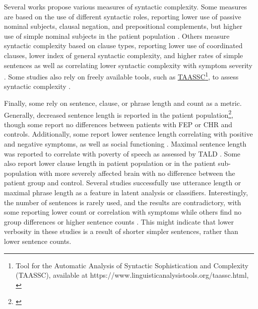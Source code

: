 Several works propose various measures of syntactic complexity. Some measures are based on the use of different syntactic roles, reporting lower use of passive nominal subjects, clausal negation, and prepositional complements, but higher use of simple nominal subjects in the patient population \citep{silva2022syntactic}. Others measure syntactic complexity based on clause types, reporting lower use of coordinated clauses, lower index of general syntactic complexity, and higher rates of simple sentences \citep{schneider2023syntactic} as well as correlating lower syntactic complexity %
with symptom severity \citep{jeong2023exploring}. Some studies also rely on freely available tools, such as \href{https://www.linguisticanalysistools.org/taassc.html}{TAASSC}\footnote{ Tool for the Automatic Analysis of Syntactic Sophistication and Complexity (TAASSC), available at https://www.linguisticanalysistools.org/taassc.html, \citep{kyle2016measuring}}, to assess syntactic complexity \citep{liang2022widespread, silva2022syntactic}.

Finally, some rely on sentence, clause, or phrase length and count as a metric. Generally, decreased sentence length is reported in the patient population\footnote{\cite{iter2018automatic, morgan2021natural, spencer2021lower, tang2021natural, bilgrami2022construct, silva2022syntactic, nettekoven2023semantic, schneider2023syntactic}}, though some report no differences between patients with FEP \citep{liang2022widespread} or CHR \citep{gupta2018automated, haas2020linking} and controls. Additionally, some report lower sentence length correlating with positive \citep{liebenthal2022linguistic} and negative \citep{bilgrami2022construct} symptoms, as well as social functioning \citep{silva2022syntactic}. Maximal sentence length was reported to correlate with poverty of speech as assessed by TALD \citep{xu2020centroid}. Some also report lower clause %
length in patient population \citep{silva2022syntactic} or in the patient sub-population with more severely affected brain \citep{liang2022widespread} with no difference between the patient group and control. Several studies successfully use utterance length \citep{tang2023latent} or maximal phrase length \citep{bedi2015automated} as a feature in latent analysis or classifiers. Interestingly, the number of sentences is rarely used, and the results are contradictory, with some reporting lower count \citep{iter2018automatic} or correlation with symptoms \citep{jeong2023exploring} while others find no group differences \citep{gupta2018automated, tang2021natural, schneider2023syntactic} or higher sentence counts \citep{morgan2021natural, nettekoven2023semantic}. This might indicate that lower verbosity in these studies is a result of shorter simpler sentences, rather than lower sentence counts.


